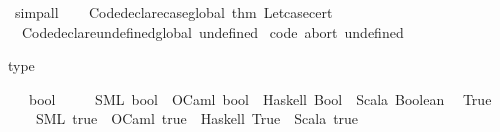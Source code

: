 \begin{isabellebody}
\ simp{\isacharunderscore}{\kern0pt}all%
\endisatagproof
{\isafoldproof}%
%
\isadelimproof
\isanewline
%
\endisadelimproof
%
\isadelimML
\isanewline
%
\endisadelimML
%
\isatagML
{}\isamarkupfalse%
\ {\isacartoucheopen}\isanewline
\ \ Code{\isachardot}{\kern0pt}declare{\isacharunderscore}{\kern0pt}case{\isacharunderscore}{\kern0pt}global\ {\isacharat}{\kern0pt}{\isacharbraceleft}{\kern0pt}thm\ Let{\isacharunderscore}{\kern0pt}case{\isacharunderscore}{\kern0pt}cert{\isacharbraceright}{\kern0pt}\ {\isacharhash}{\kern0pt}{\isachargreater}{\kern0pt}\isanewline
\ \ Code{\isachardot}{\kern0pt}declare{\isacharunderscore}{\kern0pt}undefined{\isacharunderscore}{\kern0pt}global\ \isactrlconstUNDERSCOREname {\isasymopen}undefined{\isasymclose}\isanewline
{\isacartoucheclose}%
\endisatagML
{\isafoldML}%
%
\isadelimML
\isanewline
%
\endisadelimML
\isanewline
{}\isamarkupfalse%
\ {\isacharbrackleft}{\kern0pt}{\isacharbrackleft}{\kern0pt}code\ abort{\isacharcolon}{\kern0pt}\ undefined{\isacharbrackright}{\kern0pt}{\isacharbrackright}{\kern0pt}%
\isadelimdocument
%
\endisadelimdocument
%
\isatagdocument
%
\isamarkuptrue%
%
\endisatagdocument
{\isafolddocument}%
%
\isadelimdocument
%
\endisadelimdocument
%
\begin{isamarkuptext}%
type %
\end{isamarkuptext}\isamarkuptrue%
\isamarkupfalse%
\isanewline
\ \ \ bool\ {\isasymrightharpoonup}\isanewline
\ \ \ \ {\isacharparenleft}{\kern0pt}SML{\isacharparenright}{\kern0pt}\ {\isachardoublequoteopen}bool{\isachardoublequoteclose}\ \ {\isacharparenleft}{\kern0pt}OCaml{\isacharparenright}{\kern0pt}\ {\isachardoublequoteopen}bool{\isachardoublequoteclose}\ \ {\isacharparenleft}{\kern0pt}Haskell{\isacharparenright}{\kern0pt}\ {\isachardoublequoteopen}Bool{\isachardoublequoteclose}\ \ {\isacharparenleft}{\kern0pt}Scala{\isacharparenright}{\kern0pt}\ {\isachardoublequoteopen}Boolean{\isachardoublequoteclose}\isanewline
{\isacharbar}{\kern0pt}\ \ True\ {\isasymrightharpoonup}\isanewline
\ \ \ \ {\isacharparenleft}{\kern0pt}SML{\isacharparenright}{\kern0pt}\ {\isachardoublequoteopen}true{\isachardoublequoteclose}\ \ {\isacharparenleft}{\kern0pt}OCaml{\isacharparenright}{\kern0pt}\ {\isachardoublequoteopen}true{\isachardoublequoteclose}\ \ {\isacharparenleft}{\kern0pt}Haskell{\isacharparenright}{\kern0pt}\ {\isachardoublequoteopen}True{\isachardoublequoteclose}\ \ {\isacharparenleft}{\kern0pt}Scala{\isacharparenright}{\kern0pt}\ {\isachardoublequoteopen}true{\isachardoublequoteclose}\isanewline

\end{isabellebody}
